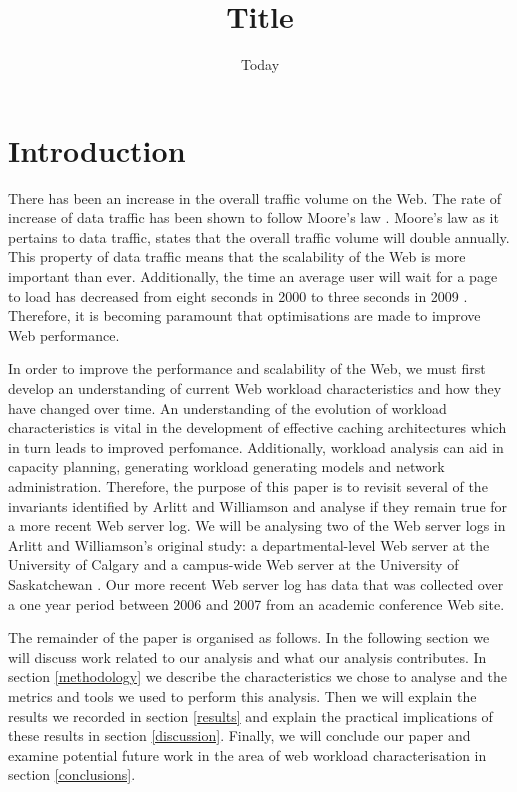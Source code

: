 \documentclass[10pt,conference]{IEEEtran}
\title{Title}
\author{\IEEEauthorblockN{Chelsea Farley, Ryan Lewis, David Armstrong, Rina Gao and Ryunosuke Madenokoji}
\IEEEauthorblockA{The University of Auckland}}
\date{Today}
\begin{document}
\maketitle

\begin{abstract}
\end{abstract}

\section{Introduction}
There has been an increase in the overall traffic volume on the Web. The rate of increase of data traffic has been shown to follow Moore's law \cite{williams05}. Moore's law as it pertains to data traffic, states that the overall traffic volume will double annually. This property of data traffic means that the scalability of the Web is more important than ever. Additionally, the time an average user will wait for a page to load has decreased from eight seconds in 2000 to three seconds in 2009 \cite{Butkiewicz}. Therefore, it is becoming paramount that optimisations are made to improve Web performance.

In order to improve the performance and scalability of the Web, we must first develop an understanding of current Web workload characteristics and how they have changed over time. An understanding of the evolution of workload characteristics is vital in the development of effective caching architectures which in turn leads to improved perfomance. Additionally, workload analysis can aid in capacity planning, generating workload generating models and network administration. Therefore, the purpose of this paper is to revisit several of the invariants identified by Arlitt and Williamson \cite{keynote} and analyse if they remain true for a more recent Web server log. We will be analysing two of the Web server logs in Arlitt and Williamson's original study: a departmental-level Web server at the University of Calgary and a campus-wide Web server at the University of Saskatchewan \cite{keynote}. Our more recent Web server log has data that was collected over a one year period between 2006 and 2007 from an academic conference Web site.

The remainder of the paper is organised as follows. In the following section we will discuss work related to our analysis and what our analysis contributes. In section \ref{methodology} we describe the characteristics we chose to analyse and the metrics and tools we used to perform this analysis. Then we will explain the results we recorded in section \ref{results} and explain the practical implications of these results in section \ref{discussion}. Finally, we will conclude our paper and examine potential future work in the area of web workload characterisation in section \ref{conclusions}.
\end{document}
